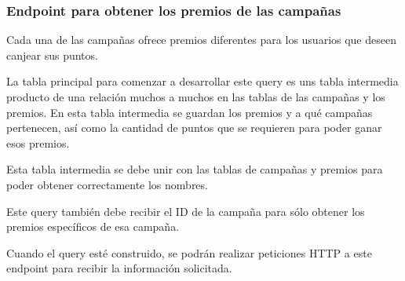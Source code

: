 \subsubsection{Endpoint para obtener los premios de las campañas}
Cada una de las campañas ofrece premios diferentes para los usuarios que deseen canjear sus puntos.

La tabla principal para comenzar a desarrollar este query es uns tabla intermedia producto de una relación muchos a muchos en las tablas de las campañas y los premios. En esta tabla intermedia se guardan los premios y a qué campañas pertenecen, así como la cantidad de puntos que se requieren para poder ganar esos premios.

Esta tabla intermedia se debe unir con las tablas de campañas y premios para poder obtener correctamente los nombres.

Este query también debe recibir el ID de la campaña para sólo obtener los premios específicos de esa campaña.

Cuando el query esté construido, se podrán realizar peticiones HTTP a este endpoint para recibir la información solicitada.
